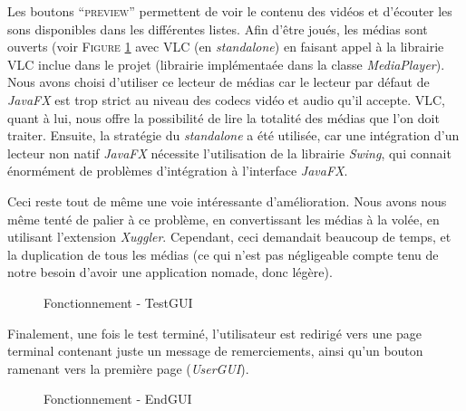 Les boutons ``\textsc{preview}'' permettent de voir le contenu des vidéos et d'écouter les sons disponibles dans les différentes listes. Afin d'être joués, les médias sont ouverts (voir \textsc{Figure} \ref{VLC} avec VLC (en \textit{standalone}) en faisant appel à la librairie VLC inclue dans le projet (librairie implémentaée dans la classe \textit{MediaPlayer}). Nous avons choisi d'utiliser ce lecteur de médias car le lecteur par défaut de \textit{JavaFX} est trop strict au niveau des codecs vidéo et audio qu'il accepte. VLC, quant à lui, nous offre la possibilité de lire la totalité des médias que l'on doit traiter. Ensuite, la stratégie du \textit{standalone} a été utilisée, car une intégration d'un lecteur non natif \textit{JavaFX} nécessite l'utilisation de la librairie \textit{Swing}, qui connait énormément de problèmes d'intégration à l'interface \textit{JavaFX}.

Ceci reste tout de même une voie intéressante d'amélioration. Nous avons nous même tenté de palier à ce problème, en convertissant les médias à la volée, en utilisant l'extension \textit{Xuggler}. Cependant, ceci demandait beaucoup de temps, et la duplication de tous les médias (ce qui n'est pas négligeable compte tenu de notre besoin d'avoir une application nomade, donc légère).

\begin{figure}[!ht]
\begin{center}
  \caption{Fonctionnement - TestGUI}
  \label{VLC} 
\end{center}
\end{figure}

Finalement, une fois le test terminé, l'utilisateur est redirigé vers une page terminal contenant juste un message de remerciements, ainsi qu'un bouton ramenant vers la première page (\textit{UserGUI}).

\begin{figure}[!ht]
\begin{center}
  \caption{Fonctionnement - EndGUI}
  \label{endGUI} 
\end{center}
\end{figure}

